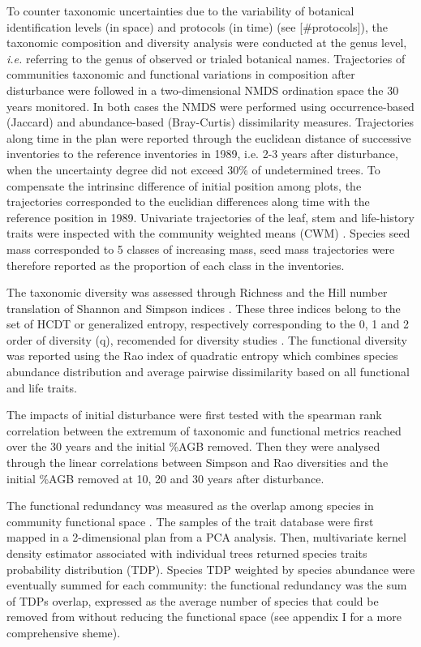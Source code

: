 \documentclass[fleqn,10pt]{ArtEcoFoG} %
\theoremstyle{definition}
\theoremstyle{definition}
\theoremstyle{definition}
\theoremstyle{remark}
\begin{document}
To counter taxonomic uncertainties due to the variability of botanical
identification levels (in space) and protocols (in time) (see {[}\#protocols{]}), the taxonomic
composition and diversity analysis were conducted at the genus level,
\emph{i.e.} referring to the genus of observed or trialed botanical
names. Trajectories of communities taxonomic and functional variations
in composition after disturbance were followed in a two-dimensional
NMDS ordination space the 30 years monitored. In both cases the NMDS were performed using occurrence-based
(Jaccard) and abundance-based (Bray-Curtis) dissimilarity measures.
Trajectories along time in the plan were reported through the euclidean
distance of successive inventories to the reference inventories in 1989,
i.e. 2-3 years after disturbance, when the uncertainty degree did not exceed
30\% of undetermined trees. To compensate the intrinsinc difference
of initial position among plots, the trajectories corresponded to the euclidian differences along time
with the reference position in 1989. Univariate trajectories of the leaf, stem and
life-history traits were inspected with the community weighted means
(CWM)
\citep{Diaz2007, Garnier2004}. Species seed mass corresponded to
5 classes of increasing mass, seed mass trajectories were therefore
reported as the proportion of each class in the inventories.

The taxonomic diversity was assessed through Richness and the Hill
number translation of Shannon and Simpson indices \citep{Hill1973}.
These three indices belong to the set of HCDT or generalized entropy,
respectively corresponding to the 0, 1 and 2 order of diversity (q),
recomended for diversity studies \citep{Patil1982, Tothmeresz1995, Marcon2015}. The
functional diversity was reported using the Rao index of quadratic
entropy which combines species abundance distribution and average
pairwise dissimilarity based on all functional and life traits.

The impacts of initial disturbance were first tested with the spearman
rank correlation between the extremum of taxonomic and functional
metrics reached over the 30 years and the initial \%AGB removed. Then
they were analysed through the linear correlations between Simpson and
Rao diversities and the initial \%AGB removed at 10, 20 and 30 years
after disturbance.

The functional redundancy was measured as the overlap among species in
community functional space \citep{Carmona2016}. The samples of the
trait database were first mapped in a 2-dimensional plan from a PCA
analysis. Then, multivariate kernel density estimator associated with
individual trees returned species traits probability distribution (TDP).
Species TDP weighted by species abundance were eventually summed for
each community: the functional redundancy was the sum of TDPs overlap,
expressed as the average number of species that could be removed from
without reducing the functional space (see appendix I for a more
comprehensive sheme).
\end{document}
